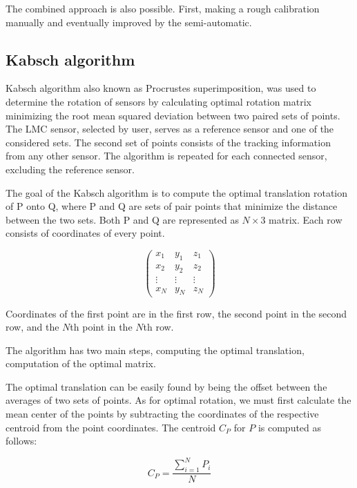 The combined approach is also possible. First, making a rough calibration manually and eventually improved by the semi-automatic.

\subsection{Kabsch algorithm}

Kabsch algorithm \cite{kabsch} also known as Procrustes superimposition, was used to determine the rotation of sensors by calculating optimal rotation matrix minimizing the root mean squared deviation between two paired sets of points. The LMC sensor, selected by user, serves as a reference sensor and one of the considered sets. The second set of points consists of the tracking information from any other sensor. The algorithm is repeated for each connected sensor, excluding the reference sensor.

The goal of the Kabsch algorithm is to compute the optimal translation rotation of P onto Q, where P and Q are sets of pair points that minimize the distance between the two sets. Both P and Q are represented as $N \times 3$ matrix. Each row consists of coordinates of every point.

\begin{equation}
    \begin{pmatrix}
        x_1 & y_1 & z_1\\
        x_2 & y_2 & z_2\\
        \vdots & \vdots & \vdots\\
        x_N & y_N & z_N
    \end{pmatrix}
\end{equation}

Coordinates of the first point are in the first row, the second point in the second row, and the $N$th point in the $N$th row.

The algorithm has two main steps, computing the optimal translation, computation of the optimal matrix.

The optimal translation can be easily found by being the offset between the averages of two sets of points. As for optimal rotation, we must first calculate the mean center of the points by subtracting the coordinates of the respective centroid from the point coordinates. The centroid $C_P$ for $P$ is computed as follows:

\begin{equation}
    {C_P = {\frac{\sum_{i=1}^{N}P_i}{N}}}
\end{equation}

